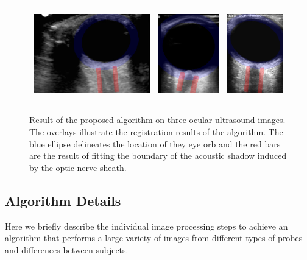 \documentclass{llncs}
\begin{document}
\begin{figure}
\centering
\begin{tabular}{ccc}
\includegraphics[height=1.6in]{003-overlay.png} &
\includegraphics[height=1.6in]{009-overlay.png} &
\includegraphics[height=1.6in]{023-overlay.png} 
\end{tabular}
\caption{
\label{fig:fitted}
Result of the proposed algorithm on three ocular ultrasound images. The
overlays illustrate the registration results of the algorithm. The blue ellipse
delineates the location of they eye orb and the red bars are the result of
fitting the boundary of the acoustic shadow induced by the optic nerve sheath.
}
\end{figure}

\subsection{Algorithm Details}
Here we briefly describe the individual image processing steps to achieve an
algorithm that performs a large variety of images from different types of probes
and differences between subjects.
\end{document}
